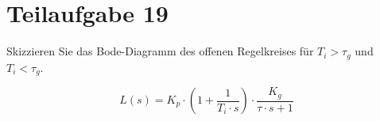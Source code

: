\section{Teilaufgabe 19}
\begin{aufgabe}
Skizzieren Sie das Bode-Diagramm des offenen Regelkreises für $T_i > \tau_g$ 
und $T_i < \tau_g$.
\end{aufgabe}
\[ L(s) = K_p \cdot \left(1 + \frac{1}{T_i \cdot s}\right) 
    \cdot \frac{K_g}{\tau \cdot s + 1}
\]
